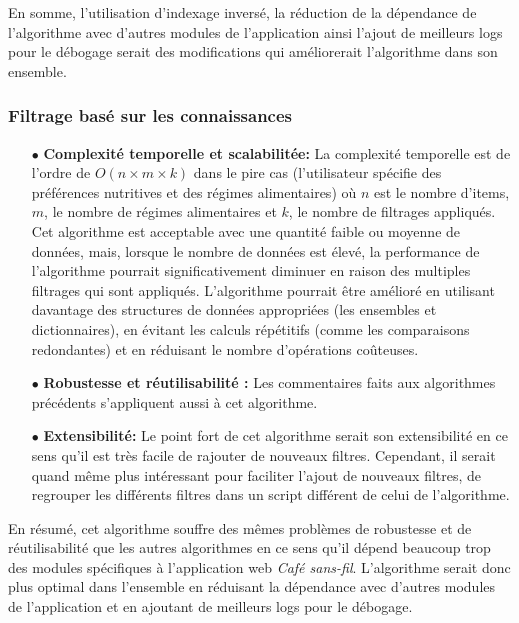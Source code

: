 \documentclass[11pt]{article}
\begin{document}
En somme, l'utilisation d'indexage inversé, la réduction de la dépendance de l'algorithme avec d'autres modules de l'application ainsi l'ajout de meilleurs logs pour le débogage serait des modifications qui améliorerait l'algorithme dans son ensemble.

\subsubsection{Filtrage basé sur les connaissances}

\begin{itemize}
	\item[$\bullet$] \textbf{Complexité temporelle et scalabilitée:} La complexité temporelle est de l'ordre de $O(n \times m \times k)$ dans le pire cas (l'utilisateur spécifie des préférences nutritives et des régimes alimentaires) où $n$ est le nombre d'items, $m$, le nombre de régimes alimentaires et $k$, le nombre de filtrages appliqués. Cet algorithme est acceptable avec une quantité faible ou moyenne de données, mais, lorsque le nombre de données est élevé, la performance de l'algorithme pourrait significativement diminuer en raison des multiples filtrages qui sont appliqués. L'algorithme pourrait être amélioré en utilisant davantage des structures de données appropriées (les ensembles et dictionnaires), en évitant les calculs répétitifs (comme les comparaisons redondantes) et en réduisant le nombre d'opérations coûteuses.\\
		
	\item[$\bullet$] \textbf{Robustesse et réutilisabilité :} Les commentaires faits aux algorithmes précédents s'appliquent aussi à cet algorithme.\\
	
	\item[$\bullet$] \textbf{Extensibilité:} Le point fort de cet algorithme serait son extensibilité en ce sens qu'il est très facile de rajouter de nouveaux filtres. Cependant, il serait quand même plus intéressant pour faciliter l'ajout de nouveaux filtres, de regrouper les différents filtres dans un script différent de celui de l'algorithme.\\
	
\end{itemize}

En résumé, cet algorithme souffre des mêmes problèmes de robustesse et de réutilisabilité que les autres algorithmes en ce sens qu'il dépend beaucoup trop des modules spécifiques à l'application web \textit{Café sans-fil}. L'algorithme serait donc plus optimal dans l'ensemble en réduisant la dépendance avec d'autres modules de l'application et en ajoutant de meilleurs logs pour le débogage.
\end{document}
